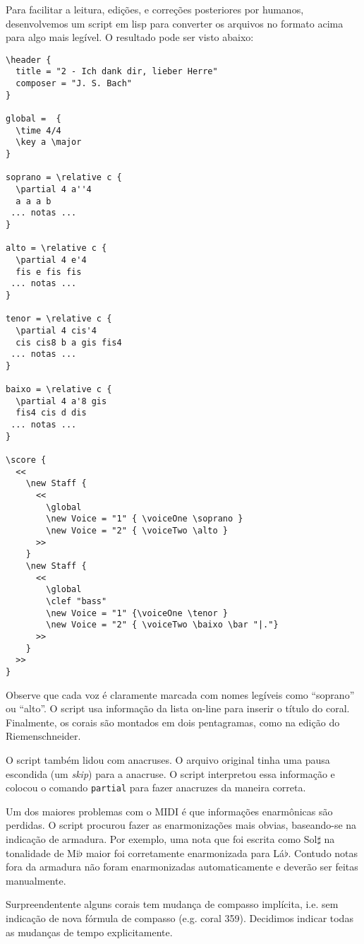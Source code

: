 \documentclass[12pt,brazil]{book}
\begin{document}
Para facilitar a leitura, edições, e correções posteriores por
humanos, desenvolvemos um script em lisp para converter os arquivos no
formato acima para algo mais legível. O resultado pode ser visto
abaixo:

\begin{verbatim}
\header {
  title = "2 - Ich dank dir, lieber Herre"
  composer = "J. S. Bach"
}

global =  {
  \time 4/4 
  \key a \major
}

soprano = \relative c {
  \partial 4 a''4 
  a a a b 
 ... notas ...
}

alto = \relative c {
  \partial 4 e'4 
  fis e fis fis 
 ... notas ...
}

tenor = \relative c {
  \partial 4 cis'4 
  cis cis8 b a gis fis4 
 ... notas ...
}

baixo = \relative c {
  \partial 4 a'8 gis 
  fis4 cis d dis 
 ... notas ...
}

\score {
  <<
    \new Staff {
      <<
        \global
        \new Voice = "1" { \voiceOne \soprano }
        \new Voice = "2" { \voiceTwo \alto }
      >>
    }
    \new Staff {
      <<
        \global
        \clef "bass"
        \new Voice = "1" {\voiceOne \tenor }
        \new Voice = "2" { \voiceTwo \baixo \bar "|."}
      >>
    }
  >>
}
\end{verbatim}

Observe que cada voz é claramente marcada com nomes legíveis como
``soprano'' ou ``alto''. O script usa informação da lista on-line para
inserir o título do coral. Finalmente, os corais são montados em dois
pentagramas, como na edição do Riemenschneider.

O script também lidou com anacruses. O arquivo original tinha uma
pausa escondida (um \textit{skip}) para a anacruse. O script
interpretou essa informação e colocou o comando \texttt{partial} para
fazer anacruzes da maneira correta.

Um dos maiores problemas com o MIDI é que informações enarmônicas são
perdidas. O script procurou fazer as enarmonizações mais obvias,
baseando-se na indicação de armadura. Por exemplo, uma nota que foi
escrita como Sol$\sharp$ na tonalidade de Mi$\flat$ maior foi
corretamente enarmonizada para Lá$\flat$. Contudo notas fora da
armadura não foram enarmonizadas automaticamente e deverão ser feitas
manualmente.

Surpreendentente alguns corais tem mudança de compasso implícita, i.e.
sem indicação de nova fórmula de compasso (e.g. coral 359). Decidimos
indicar todas as mudanças de tempo explicitamente.
\end{document}
